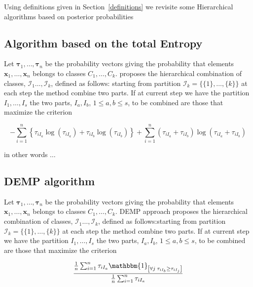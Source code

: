 \documentclass[10pt, a4paper]{article}
\begin{document}
Using definitions given in Section~\ref{definitions} we revisite some Hierarchical algorithms based on posterior probabilities

\subsection*{Algorithm based on the total Entropy}

Let ${\boldsymbol\tau}_1, \dots, {\boldsymbol\tau}_n$ be the probability vectors giving the probability that elements $\textbf{x}_1, \dots, \textbf{x}_n$ belongs to classes $C_1, \dots, C_k$.  \cite{baudry2010combining} proposes the  hierarchical combination of classes,  $\mathcal{I}_1 \dots, \mathcal{I}_k$, defined as follows: starting from partition $\mathcal{I}_k = \{\{1\},\dots, \{k\}\}$ at each step the method combine two parts. If at current step we have the partition  $I_1, \dots, I_s$ the two parts, $I_a, I_b$, $1 \leq a,b \leq s$, to be combined are those that maximize the criterion

\[
- \sum_{i=1}^n \left\{ \tau_{iI_a} \log(\tau_{iI_a}) + \tau_{iI_b} \log(\tau_{iI_b})\right\} +  \sum_{i=1}^n  (\tau_{iI_a}+\tau_{iI_b}) \log(\tau_{iI_a} + \tau_{iI_b})
\]

in other words $\dots$

\subsection*{DEMP algorithm}

Let ${\boldsymbol\tau}_1, \dots, {\boldsymbol\tau}_n$ be the probability vectors giving the probability that elements $\textbf{x}_1, \dots, \textbf{x}_n$ belongs to classes $C_1, \dots, C_k$. DEMP approach \citep{hennig2010methods} proposes the hierarchical combination of classes,  $\mathcal{I}_1 \dots, \mathcal{I}_k$, defined as follows:starting from partition $\mathcal{I}_k = \{\{1\},\dots, \{k\}\}$ at each step the method combine two parts. If at current step we have the partition  $I_1, \dots, I_s$ the two parts, $I_a, I_b$, $1 \leq a,b \leq s$,  to be combined are those that maximize the criterion

\[
\frac{ \frac{1}{n} \sum_{i=1}^n {\tau_{iI_a} \mathbbm{1}_{\left[ \forall j\; \tau_{i I_{b}} \geq \tau_{iI_j} \right]}}}{ \frac{1}{n} \sum_{i=1}^n \tau_{iI_a}}
\]



{}
\end{document}
